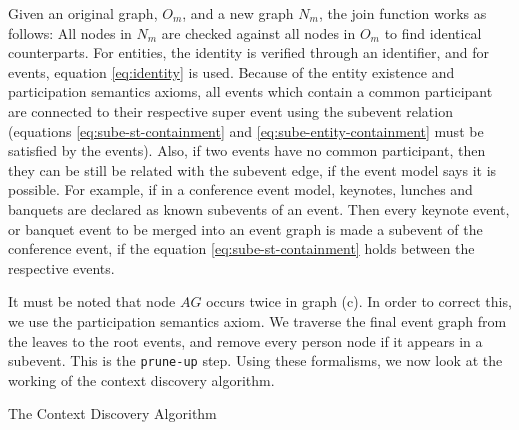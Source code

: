 Given an original graph, $O_m$, and a new graph $N_m$, the join function works as follows: All nodes in $N_m$ are checked against all nodes in $O_m$ to find identical counterparts. For entities, the identity is verified through an identifier, and for events, equation \eqref{eq:identity} is used. Because of the entity existence and participation semantics axioms, all events which contain a common participant are connected to their respective super event using the subevent relation (equations \eqref{eq:sube-st-containment} and \eqref{eq:sube-entity-containment} must be satisfied by the events). Also, if two events have no common participant, then they can be still be related with the subevent edge, if the event model says it is possible. For example, if in a conference event model, keynotes, lunches and banquets are declared as known subevents of an event. Then every keynote event, or banquet event to be merged into an event graph is made a subevent of the conference event, if the equation \eqref{eq:sube-st-containment} holds between the respective events. 

It must be noted that node $AG$ occurs twice in graph (c). In order to correct this, we use the participation semantics axiom. We traverse the final event graph from the leaves to the root events, and remove every person node if it appears in a subevent. This is the \texttt{prune-up} step. Using these formalisms, we now look at the working of the context discovery algorithm. 

\SetAlgoSkip{}
\begin{algorithm}[t]
\dontprintsemicolon 
{}
\caption{The Context Discovery Algorithm}
\label{alg:cx-alg}
\end{algorithm}

